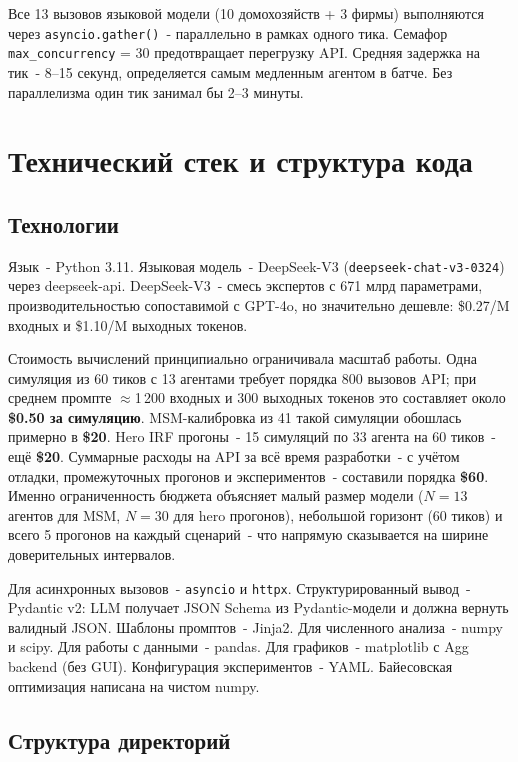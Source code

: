\documentclass[12pt, a4paper]{article}
\begin{document}
Все 13 вызовов языковой модели (10 домохозяйств + 3 фирмы) выполняются через \texttt{asyncio.gather()}~- параллельно в рамках одного тика. Семафор \texttt{max\_concurrency} = 30 предотвращает перегрузку API. Средняя задержка на тик~- 8--15 секунд, определяется самым медленным агентом в батче. Без параллелизма один тик занимал бы 2--3 минуты.

\section{Технический стек и структура кода}

\subsection{Технологии}

Язык~- Python 3.11. Языковая модель~- DeepSeek-V3 (\texttt{deepseek-chat-v3-0324}) через deepseek-api. DeepSeek-V3~- смесь экспертов с 671 млрд параметрами, производительностью сопоставимой с GPT-4o, но значительно дешевле: \$0.27/M входных и \$1.10/M выходных токенов.

Стоимость вычислений принципиально ограничивала масштаб работы. Одна симуляция из 60 тиков с 13 агентами требует порядка 800 вызовов API; при среднем промпте $\approx$1\,200 входных и 300 выходных токенов это составляет около \textbf{\$0.50 за симуляцию}. MSM-калибровка из 41 такой симуляции обошлась примерно в \textbf{\$20}. Hero IRF прогоны~- 15 симуляций по 33 агента на 60 тиков~- ещё \textbf{\$20}. Суммарные расходы на API за всё время разработки~- с учётом отладки, промежуточных прогонов и экспериментов~- составили порядка \textbf{\$60}. Именно ограниченность бюджета объясняет малый размер модели ($N = 13$ агентов для MSM, $N = 30$ для hero прогонов), небольшой горизонт (60 тиков) и всего 5 прогонов на каждый сценарий~- что напрямую сказывается на ширине доверительных интервалов.

Для асинхронных вызовов~- \texttt{asyncio} и \texttt{httpx}. Структурированный вывод~- Pydantic v2: LLM получает JSON Schema из Pydantic-модели и должна вернуть валидный JSON. Шаблоны промптов~- Jinja2. Для численного анализа~- numpy и scipy. Для работы с данными~- pandas. Для графиков~- matplotlib с Agg backend (без GUI). Конфигурация экспериментов~- YAML. Байесовская оптимизация написана на чистом numpy.

\subsection{Структура директорий}
\end{document}
